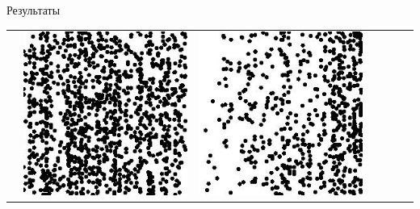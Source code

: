 \documentclass[12pt]{beamer}
\begin{document}
\begin{frame}{Результаты}
\begin{table}
\begin{center}
\begin{tabular}{p{1.2cm} p{1.2cm} p{1.2cm} p{1.2cm} p{1.2cm} p{1.2cm} p{1.2cm}}
					&
					\includegraphics[width=1\linewidth]{8-results/sand-trend2/right2}
					&
					\includegraphics[width=1\linewidth]{8-results/sand-trend2/pan2}
					&

\end{tabular}
\end{center}
\end{table}
\end{frame}
\end{document}

